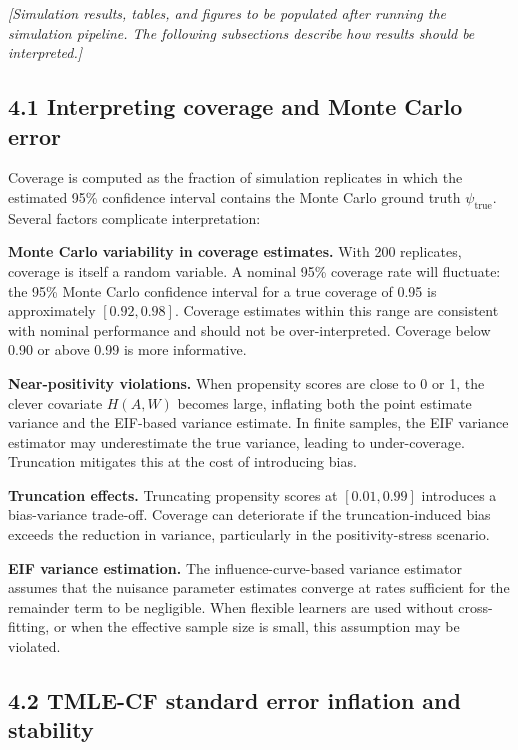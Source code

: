 \documentclass[
  letterpaper,
  DIV=11,
  numbers=noendperiod]{scrartcl}
\begin{document}
\emph{{[}Simulation results, tables, and figures to be populated after
running the simulation pipeline. The following subsections describe how
results should be interpreted.{]}}

\subsection{4.1 Interpreting coverage and Monte Carlo
error}\label{interpreting-coverage-and-monte-carlo-error}

Coverage is computed as the fraction of simulation replicates in which
the estimated 95\% confidence interval contains the Monte Carlo ground
truth \(\psi_{\text{true}}\). Several factors complicate interpretation:

\textbf{Monte Carlo variability in coverage estimates.} With 200
replicates, coverage is itself a random variable. A nominal 95\%
coverage rate will fluctuate: the 95\% Monte Carlo confidence interval
for a true coverage of 0.95 is approximately \([0.92, 0.98]\). Coverage
estimates within this range are consistent with nominal performance and
should not be over-interpreted. Coverage below 0.90 or above 0.99 is
more informative.

\textbf{Near-positivity violations.} When propensity scores are close to
0 or 1, the clever covariate \(H(A, W)\) becomes large, inflating both
the point estimate variance and the EIF-based variance estimate. In
finite samples, the EIF variance estimator may underestimate the true
variance, leading to under-coverage. Truncation mitigates this at the
cost of introducing bias.

\textbf{Truncation effects.} Truncating propensity scores at
\([0.01, 0.99]\) introduces a bias-variance trade-off. Coverage can
deteriorate if the truncation-induced bias exceeds the reduction in
variance, particularly in the positivity-stress scenario.

\textbf{EIF variance estimation.} The influence-curve-based variance
estimator assumes that the nuisance parameter estimates converge at
rates sufficient for the remainder term to be negligible. When flexible
learners are used without cross-fitting, or when the effective sample
size is small, this assumption may be violated.

\subsection{4.2 TMLE-CF standard error inflation and
stability}\label{tmle-cf-standard-error-inflation-and-stability}
\end{document}
